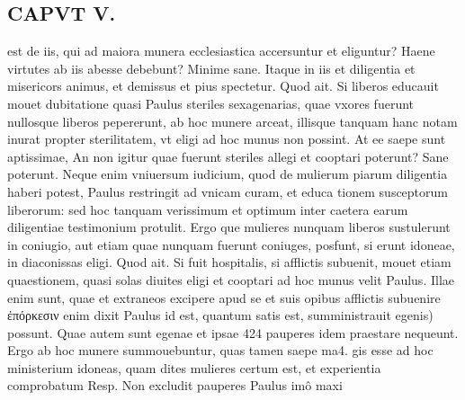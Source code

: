 \documentclass{article}
\begin{document}
\begin{pages}
\section*{CAPVT  V. }
\marginpar{[ p.279 ]}\pstart est de iis, qui ad maiora munera ecclesiastica accersuntur et eliguntur? Haene virtutes ab iis abesse debebunt? Minime sane. Itaque in iis et diligentia et misericors animus, et demissus et pius spectetur. Quod ait. Si liberos educauit mouet dubitatione quasi Paulus steriles sexagenarias, quae vxores fuerunt nullosque liberos pepererunt, ab hoc munere arceat, illisque tanquam hanc notam inurat propter sterilitatem, vt eligi ad hoc munus non possint. At ee saepe sunt aptissimae, An non igitur quae fuerunt steriles allegi et cooptari poterunt? Sane poterunt. Neque enim vniuersum iudicium, quod de mulierum piarum diligentia haberi potest, Paulus restringit ad vnicam curam, et educa tionem susceptorum liberorum: sed hoc tanquam verissimum et optimum inter caetera earum diligentiae testimonium protulit. Ergo que mulieres nunquam liberos sustulerunt in coniugio, aut etiam quae nunquam fuerunt coniuges, posfunt, si erunt idoneae, in diaconissas eligi.  Quod ait. Si fuit hospitalis, si afflictis subuenit, mouet etiam quaestionem, quasi solas diuites eligi et cooptari ad hoc munus velit Paulus. Illae enim sunt, quae et extraneos excipere apud se et suis opibus afflictis subuenire ἐπόρκεσιν enim dixit Paulus id est, quantum satis est, sumministrauit egenis) possunt. Quae autem sunt egenae et ipsae 424 pauperes idem praestare nequeunt. Ergo ab hoc munere summouebuntur, quas tamen saepe ma4. gis esse ad hoc ministerium idoneas, quam dites mulieres certum est, et experientia comprobatum Resp. Non excludit pauperes Paulus imô maxi\pend

\end{pages}
\end{document}
